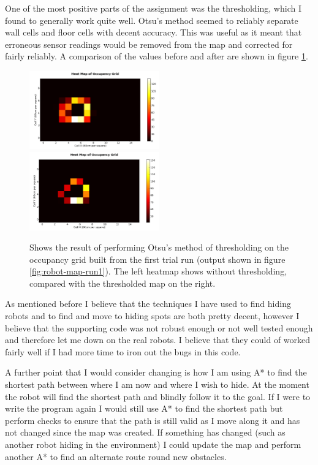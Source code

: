 \documentclass{article}
\begin{document}
One of the most positive parts of the assignment was the thresholding, which I found to generally work quite well. Otsu's method seemed to reliably separate wall cells and floor cells with decent accuracy. This was useful as it meant that erroneous sensor readings would be removed from the map and corrected for fairly reliably. A comparison of the values before and after are shown in figure \ref{fig:robot-map-start}.

\begin{figure}[H]
\includegraphics[width=0.5\textwidth]{img/og_no_threshold.png}
\includegraphics[width=0.5\textwidth]{img/og_thresholded.png}
\caption{Shows the result of performing Otsu's method of thresholding on the occupancy grid built from the first trial run (output shown in figure \ref{fig:robot-map-run1}). The left heatmap shows without thresholding, compared with the thresholded map on the right.}
\label{fig:robot-map-start}
\end{figure}

As mentioned before I believe that the techniques I have used to find hiding robots and to find and move to hiding spots are both pretty decent, however I believe that the supporting code was not robust enough or not well tested enough and therefore let me down on the real robots. I believe that they could of worked fairly well if I had more time to iron out the bugs in this code.

A further point that I would consider changing is how I am using A* to find the shortest path between where I am now and where I wish to hide. At the moment the robot will find the shortest path and blindly follow it to the goal. If I were to write the program again I would still use A* to find the shortest path but perform checks to ensure that the path is still valid as I move along it and has not changed since the map was created. If something has changed (such as another robot hiding in the environment) I could update the map and perform another A* to find an alternate route round new obstacles.
\end{document}
